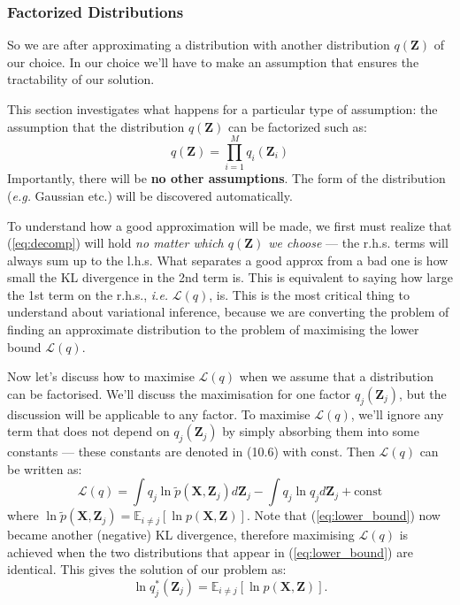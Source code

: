 \documentclass[a4paper]{article}
\newcommand{\eg}{\textit{e.g. }}
\newcommand{\ie}{\textit{i.e. }}
\newcommand{\mb}{\mathbf}
\begin{document}
\subsubsection{Factorized Distributions}
So we are after approximating a distribution with another distribution $q(\mb{Z})$ of our choice. In our choice we'll have to make an assumption that ensures the tractability of our solution. 

This section investigates what happens for a particular type of assumption: the assumption that the distribution $q(\mb{Z})$ can be factorized such as:
%
\begin{equation}
q(\mb{Z}) = \prod\limits_{i=1}^M q_i(\mb{Z}_i)
\end{equation}
%
%
Importantly, there will be \textbf{no other assumptions}. The form of the distribution (\eg Gaussian etc.) will be discovered automatically.

To understand how a good approximation will be made, we first must realize that (\ref{eq:decomp}) will hold \textit{no matter which $q(\mb{Z})$ we choose} \---- the r.h.s. terms will always sum up to the l.h.s. What separates a good approx from a bad one is how small the KL divergence in the 2nd term is. This is equivalent to saying how large the 1st term on the r.h.s., \ie $\mathcal{L}(q)$, is. This is the most critical thing to understand about variational inference, because we are converting the problem of finding an approximate distribution to the problem of maximising the lower bound $\mathcal{L}(q)$.

Now let's discuss how to maximise $\mathcal{L}(q)$ when we assume that a distribution can be factorised. We'll discuss the maximisation for one factor $q_j(\mb{Z}_j)$, but the discussion will be applicable to any factor. To maximise $\mathcal{L}(q)$, we'll ignore any term that does not depend on $q_j(\mb{Z}_j)$ by simply absorbing them into some constants \---- these constants are denoted in (10.6) with $\text{const}$. Then $\mathcal{L}(q)$ can be written as: 
%
%
\begin{equation}
\mathcal{L}(q) = \int q_j \ln \tilde{p}(\mb{X},\mb{Z}_j) d\mb{Z}_j-\int q_j \ln q_j d\mb{Z}_j+\text{const} \label{eq:lower_bound}
\end{equation}
where $\ln \tilde{p}(\mb{X},\mb{Z}_j) = \mathbb{E}_{i\neq j} [\ln p(\mb{X,Z})]$. Note that (\ref{eq:lower_bound}) now became another (negative) KL divergence, therefore maximising $\mathcal{L}(q)$ is achieved when the two distributions that appear in (\ref{eq:lower_bound}) are identical. This gives the solution of our problem as:
%
\begin{equation}
\ln q_j^{*}(\mb{Z}_j) = \mathbb{E}_{i\neq j} [\ln p(\mb{X,Z})].
\end{equation}
\end{document}
